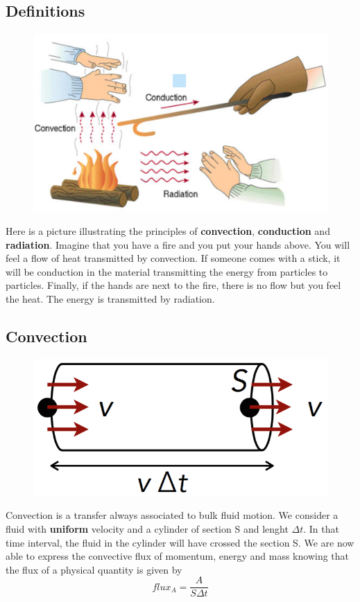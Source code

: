 \subsection{Definitions}
	\begin{figure}
	\vspace{-5mm}
	\includegraphics[scale=0.3]{ch1/1}
	\end{figure}
	Here is a picture illustrating the principles of \textbf{convection}, \textbf{conduction} and \textbf{radiation}. Imagine that you have a fire and you put your hands above. You will feel a flow of heat transmitted by convection. If someone comes with a stick, it will be conduction in the material transmitting the energy from particles to particles. Finally, if the hands are next to the fire, there is no flow but you feel the heat. The energy is transmitted by radiation. 
	
\subsection{Convection}
	\begin{figure}
	\includegraphics[scale=0.3]{ch1/2}
	\end{figure}
	Convection is a transfer always associated to bulk fluid motion. We consider a fluid with \textbf{uniform} velocity and a cylinder of section S and lenght $\Delta t$. In that time interval, the fluid in the cylinder will have crossed the section S. We are now able to express the convective flux of momentum, energy and mass knowing that the flux of a physical quantity is given by 
	\begin{equation}
	flux _A = \frac{A}{S\Delta t}
	\end{equation}
		
	
	

